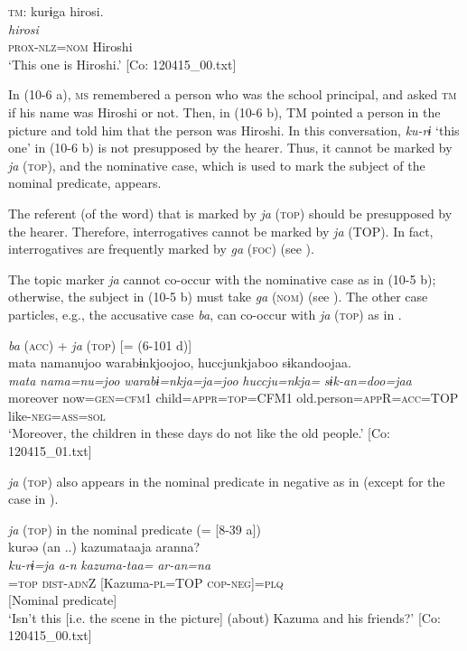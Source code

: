   \ex  \textsc{tm}: \glll    kurɨga  hirosi.\\
      \textit{}  \textit{hirosi}\\
      \textsc{prox}-\textsc{nlz}=\textsc{nom}  Hiroshi\\
      \glt       ‘This one is Hiroshi.’ [Co: 120415\_00.txt]
    \z
\z

In (10-6 a), \textsc{ms} remembered a person who was the school principal, and asked \textsc{tm} if his name was Hiroshi or not. Then, in (10-6 b), TM pointed a person in the picture and told him that the person was Hiroshi. In this conversation, \textit{ku-rɨ} ‘this one’ in (10-6 b) is not presupposed by the hearer. Thus, it cannot be marked by \textit{ja} (\textsc{top}), and the nominative case, which is used to mark the subject of the nominal predicate, appears.

  The referent (of the word) that is marked by \textit{ja} (\textsc{top}) should be presupposed by the hearer. Therefore, interrogatives cannot be marked by \textit{ja} (TOP). In fact, interrogatives are frequently marked by \textit{ga} (\textsc{foc}) (see ).

  The topic marker \textit{ja} cannot co-occur with the nominative case as in (10-5 b); otherwise, the subject in (10-5 b) must take \textit{ga} (\textsc{nom}) (see ). The other case particles, e.g., the accusative case \textit{ba}, can co-occur with \textit{ja} (\textsc{top}) as in .

\ea\label{ex:10.7}   \textit{ba} (\textsc{acc}) + \textit{ja} (\textsc{top}) [= (6-101 d)]\\
      \glll    mata  namanujoo  warabɨnkjoojoo, huccjunkjaboo  sɨkandoojaa.\\
    \textit{mata}  \textit{nama=nu=joo}  \textit{warabɨ=nkja=ja=joo}    \textit{huccju=nkja=}  \textit{sɨk-an=doo=jaa}\\
    moreover  now=\textsc{gen}=\textsc{cfm}1  child=\textsc{appr}=\textsc{top}=CFM1  old.person=\textsc{app}R=\textsc{acc}=TOP  like-\textsc{neg}=\textsc{ass}=\textsc{sol}\\
\glt     ‘Moreover, the children in these days do not like the old people.’  [Co: 120415\_01.txt]
\z

  \textit{ja} (\textsc{top}) also appears in the nominal predicate in negative as in  (except for the case in ).

\ea\label{ex:10.8}   \textit{ja} (\textsc{top}) in the nominal predicate (= [8-39 a])\\
      \gllll    kurəə  {(an ..)}  kazumataaja  aranna?\\
    \textit{ku-rɨ=ja}  \textit{a-n}  \textit{kazuma-taa=}  \textit{ar-an=na}\\
    [\textsc{prox}-\textsc{nlz}]=\textsc{top}  \textsc{dist}-\textsc{adn}Z  [Kazuma-\textsc{pl}=TOP  \textsc{cop}-\textsc{neg}]=\textsc{plq}\\
    [Subject]    [Nominal predicate]\\
    \glt ‘Isn’t this [i.e. the scene in the picture] (about) Kazuma and his friends?’ [Co: 120415\_00.txt]
\z    

